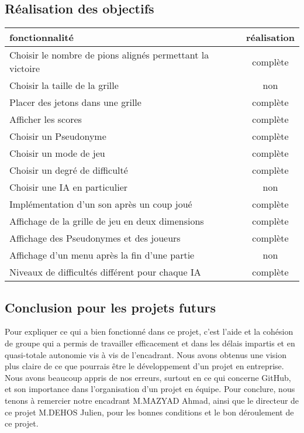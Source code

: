 \documentclass[a4paper,oneside]{article}
\begin{document}
\subsection{Réalisation des objectifs }

\begin{tabular}{| l | c |}
\hline
fonctionnalité & réalisation \\
\hline
\hline
Choisir le nombre de pions alignés permettant la victoire  & complète \\
\hline
Choisir la taille de la grille & non \\
\hline
Placer des jetons dans une grille & complète \\
\hline
Afficher les scores & complète \\
\hline
Choisir un Pseudonyme & complète \\
\hline
Choisir un mode de jeu & complète \\
\hline
Choisir un degré de difficulté & complète \\
\hline
Choisir une IA en particulier & non \\
\hline
Implémentation d'un son après un coup joué & complète \\
\hline
Affichage de la grille de jeu en deux dimensions & complète \\
\hline
Affichage des Pseudonymes et des joueurs & complète \\
\hline
Affichage d'un menu après la fin d'une partie & non \\
\hline
Niveaux de difficultés différent pour chaque IA & complète \\
\hline
\end{tabular}


\subsection{Conclusion pour les projets futurs}

Pour expliquer ce qui a bien fonctionné dans ce projet, c'est l'aide et la cohésion de groupe qui a permis de travailler efficacement et dans les délais impartis et en quasi-totale autonomie vis à vis de l'encadrant.
Nous avons obtenus une vision plus claire de ce que pourrais être le développement d'un projet en entreprise.
Nous avons beaucoup appris de nos erreurs, surtout en ce qui concerne GitHub, et son importance dans l'organisation d'un projet en équipe.
Pour conclure, nous tenons à remercier notre encadrant M.MAZYAD Ahmad, ainsi que le directeur de ce projet M.DEHOS Julien, pour les bonnes conditions et le bon déroulement de ce projet. 





\label{myLastPage}
\end{document}
